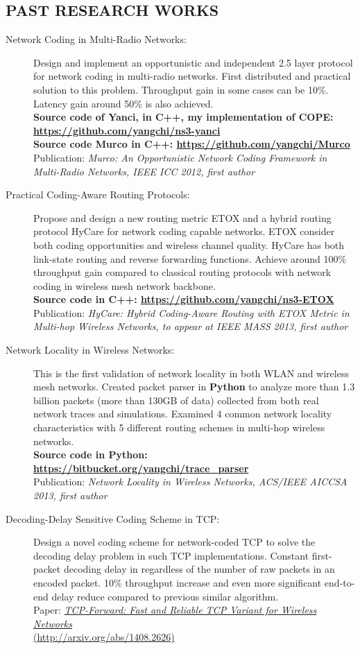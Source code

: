 \documentclass[line]{res}
\begin{document}
\begin{resume}
	\section{PAST RESEARCH WORKS}
	\begin{description}
		\item[Network Coding in Multi-Radio Networks:] 
			Design and implement an opportunistic and independent 2.5 layer protocol for network coding in multi-radio networks. First distributed and practical solution to this problem. Throughput gain in some cases can be 10\%. Latency gain around 50\% is also achieved. \\
			\textbf{Source code of Yanci, in C++, my implementation of COPE: \url{https://github.com/yangchi/ns3-yanci}} \\
			\textbf{Source code Murco in C++: \url{https://github.com/yangchi/Murco}} \\
			Publication: \emph{Murco: An Opportunistic Network Coding Framework in Multi-Radio Networks, IEEE ICC 2012, first author}
		\item[Practical Coding-Aware Routing Protocols:] 
			Propose and design a new routing metric ETOX and a hybrid routing protocol HyCare for network coding capable networks. ETOX consider both coding opportunities and wireless channel quality. HyCare has both link-state routing and reverse forwarding functions. Achieve around 100\% throughput gain compared to classical routing protocols with network coding in wireless mesh network backbone.\\
			\textbf{Source code in C++: \url{https://github.com/yangchi/ns3-ETOX} } \\
			Publication: \emph{HyCare: Hybrid Coding-Aware Routing with ETOX Metric in Multi-hop Wireless Networks, to appear at IEEE MASS 2013, first author}
		\item[Network Locality in Wireless Networks:] 
			This is the first validation of network locality in both WLAN and wireless mesh networks. Created packet parser in \textbf{Python} to analyze more than 1.3 billion packets (more than 130GB of data) collected from both real network traces and simulations. Examined 4 common network locality characteristics with 5 different routing schemes in multi-hop wireless networks.\\
			\textbf{Source code in Python: \url{https://bitbucket.org/yangchi/trace_parser} } \\
			Publication: \emph{Network Locality in Wireless Networks, ACS/IEEE AICCSA 2013, first author}
		\item [Decoding-Delay Sensitive Coding Scheme in TCP:]
			Design a novel coding scheme for network-coded TCP to solve the decoding delay problem in such TCP implementations. Constant first-packet decoding delay in regardless of the number of raw packets in an encoded packet. 10\% throughput increase and even more significant end-to-end delay reduce compared to previous similar algorithm. \\
			Paper: \href{http://arxiv.org/abs/1408.2626}{\emph{TCP-Forward: Fast and Reliable TCP Variant for Wireless Networks}  \\ (http://arxiv.org/abs/1408.2626)}
	\end{description}
	

\end{resume}
\end{document}
